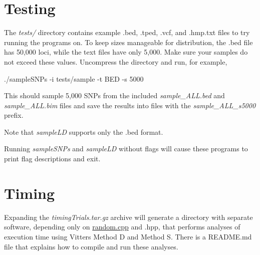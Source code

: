 \section*{Testing}

The {\itshape tests/} directory contains example .bed, .tped, .vcf, and .hmp.\+txt files to try running the programs on. To keep sizes manageable for distribution, the .bed file has 50,000 loci, while the text files have only 5,000. Make sure your samples do not exceed these values. Uncompress the directory and run, for example, \begin{DoxyVerb}./sampleSNPs -i tests/sample -t BED -s 5000
\end{DoxyVerb}


This should sample 5,000 S\+N\+Ps from the included {\itshape sample\+\_\+\+A\+L\+L.\+bed} and {\itshape sample\+\_\+\+A\+L\+L.\+bim} files and save the results into files with the {\itshape sample\+\_\+\+A\+L\+L\+\_\+s5000} prefix.

Note that {\itshape sample\+LD} supports only the .bed format.

Running {\itshape sample\+S\+N\+Ps} and {\itshape sample\+LD} without flags will cause these programs to print flag descriptions and exit.

\section*{Timing}

Expanding the {\itshape timing\+Trials.\+tar.\+gz} archive will generate a directory with separate software, depending only on \hyperlink{random_8cpp}{random.\+cpp} and .hpp, that performs analyses of execution time using Vitter\textquotesingle{}s Method D and Method S. There is a R\+E\+A\+D\+M\+E.\+md file that explains how to compile and run these analyses. 